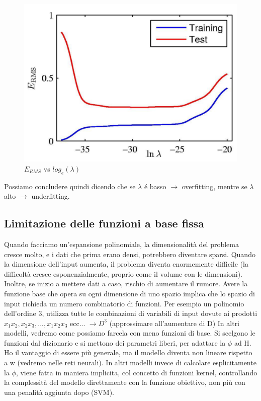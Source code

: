 \documentclass{article}
\begin{document}
\begin{figure}[H]
\centering
\includegraphics[scale=0.3]{Images/Ermsvslambda.png}
\caption{$E_{RMS}$ vs $log_e(\lambda)$}
\end{figure}

Possiamo concludere quindi dicendo che se $\lambda$ é basso $\rightarrow$ overfitting, mentre se $\lambda$ alto $\rightarrow$ underfitting.

\subsection{Limitazione delle funzioni a base fissa}
Quando facciamo un'espansione polinomiale, la dimensionalità del problema cresce molto, e i dati che prima erano densi, potrebbero diventare sparsi. Quando la dimensione dell'input aumenta, il problema diventa enormemente difficile (la difficoltà cresce esponenzialmente, proprio come il volume con le dimensioni). Inoltre, se inizio a mettere dati a caso, rischio di aumentare il rumore. Avere la funzione base che opera su ogni dimensione di uno spazio implica che lo spazio di input richieda un numero combinatorio di funzioni. Per esempio un polinomio dell'ordine 3, utilizza tutte le combinazioni di variabili di input dovute ai prodotti $x_1x_2, x_2x_3, ..., x_1x_2x_3 \text{ ecc... }\rightarrow D^3$ (approssimare all'aumentare di D) \newline
In altri modelli, vedremo come possiamo farcela con meno funzioni di base. Si scelgono le funzioni dal dizionario e si mettono dei parametri liberi, per adattare la $\phi$ ad H.
Ho il vantaggio di essere più generale, ma il modello diventa non lineare rispetto a w (vedremo nelle reti neurali). \newline 
In altri modelli invece di calcolare esplicitamente la $\phi$, viene fatta in maniera implicita, col concetto di funzioni kernel, controllando la complessità del modello direttamente con la funzione obiettivo, non più con una penalità aggiunta dopo (SVM).
\clearpage
\end{document}
